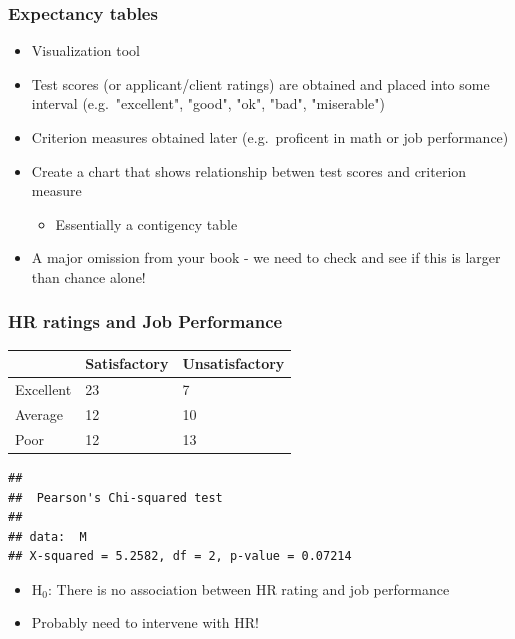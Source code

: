 \documentclass[dvipsnames]{beamer}\usepackage[]{graphicx}\usepackage[]{color}
\makeatletter
\newenvironment{kframe}{%
 \def\at@end@of@kframe{}%
 \ifinner\ifhmode%
  \def\at@end@of@kframe{\end{minipage}}%
  \begin{minipage}{\columnwidth}%
 \fi\fi%
 \def\FrameCommand##1{\hskip\@totalleftmargin \hskip-\fboxsep
 \colorbox{shadecolor}{##1}\hskip-\fboxsep
     \hskip-\linewidth \hskip-\@totalleftmargin \hskip\columnwidth}%
 \MakeFramed {\advance\hsize-\width
   \@totalleftmargin\z@ \linewidth\hsize
   \@setminipage}}%
 {\par\unskip\endMakeFramed%
 \at@end@of@kframe}
\newenvironment{knitrout}{}{} %
\makeatother
\begin{document}
\begin{frame}
  \frametitle{Expectancy tables}
\begin{itemize}
  \item Visualization tool
  \item Test scores (or applicant/client ratings) are obtained and placed into some interval (e.g.\ "excellent", "good", "ok", "bad", "miserable")
  \item Criterion measures obtained later (e.g.\ proficent in math or job performance)
  \item Create a chart that shows relationship betwen test scores and criterion measure
    \begin{itemize}
      \item Essentially a contigency table
    \end{itemize}
  \item A major omission from your book - \textcolor{wared}{we need to check and see if this is larger than chance alone!}
\end{itemize}
\end{frame}

\begin{frame}[fragile]
\frametitle{HR ratings and Job Performance}
\begin{center}
\begin{tabular}{lll}
\hline
& Satisfactory & Unsatisfactory \\
\hline
Excellent & 23 & 7 \\
Average & 12 & 10 \\
Poor & 12 & 13 \\
\hline
\end{tabular}
\end{center}
\begin{knitrout}
\color{fgcolor}\begin{kframe}


{\ttfamily\noindent\bfseries\color{errorcolor}{\#\# Error: geom\_text requires the following missing aesthetics: y}}\end{kframe}
\end{knitrout}

\end{frame}


\begin{frame}[fragile]
\begin{knitrout}
\color{fgcolor}\begin{kframe}
\begin{verbatim}
## 
## 	Pearson's Chi-squared test
## 
## data:  M
## X-squared = 5.2582, df = 2, p-value = 0.07214
\end{verbatim}
\end{kframe}
\end{knitrout}

\begin{itemize}
  \item<1-> H$_0$: There is no association between HR rating and job performance
  \item<2-> Probably need to intervene with HR!
\end{itemize}
\end{frame}
\end{document}
